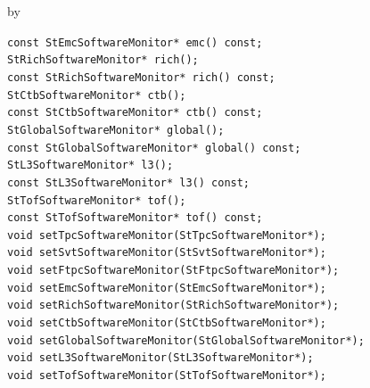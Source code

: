 \documentclass[twoside]{article}
\newcommand{\entrylabel}[1]{\mbox{\textbf{{#1}}}\hfil}%
\newenvironment{entry}
{\begin{list}{}%
    {\renewcommand{\makelabel}{\entrylabel}%
     \setlength{\labelwidth}{90pt}%
     \setlength{\leftmargin}{\labelwidth}
     \advance\leftmargin by \labelsep%
      }%
    }%
  {\end{list}}
\newcommand{\Entrylabel}[1]%
{\raisebox{0pt}[1ex][0pt]{\makebox[\labelwidth][l]%
    {\parbox[t]{\labelwidth}{\hspace{0pt}\textbf{{#1}}}}}}
\newenvironment{Entry}%
{\renewcommand{\entrylabel}{\Entrylabel}\begin{entry}}%
  {\end{entry}}
\begin{document}
\begin{Entry}
    \verb+const StEmcSoftwareMonitor* emc() const;+\\
    \verb+StRichSoftwareMonitor* rich();+\\
    \verb+const StRichSoftwareMonitor* rich() const;+\\
    \verb+StCtbSoftwareMonitor* ctb();+\\
    \verb+const StCtbSoftwareMonitor* ctb() const;+\\
    \verb+StGlobalSoftwareMonitor* global();+\\
    \verb+const StGlobalSoftwareMonitor* global() const;+\\
    \verb+StL3SoftwareMonitor* l3();+\\
    \verb+const StL3SoftwareMonitor* l3() const;+\\
    \verb+StTofSoftwareMonitor* tof();+\\
    \verb+const StTofSoftwareMonitor* tof() const;+\\

    \verb+void setTpcSoftwareMonitor(StTpcSoftwareMonitor*);+\\
    \verb+void setSvtSoftwareMonitor(StSvtSoftwareMonitor*);+\\
    \verb+void setFtpcSoftwareMonitor(StFtpcSoftwareMonitor*);+\\
    \verb+void setEmcSoftwareMonitor(StEmcSoftwareMonitor*);+\\
    \verb+void setRichSoftwareMonitor(StRichSoftwareMonitor*);+\\
    \verb+void setCtbSoftwareMonitor(StCtbSoftwareMonitor*);+\\
    \verb+void setGlobalSoftwareMonitor(StGlobalSoftwareMonitor*);+\\
    \verb+void setL3SoftwareMonitor(StL3SoftwareMonitor*);+\\
    \verb+void setTofSoftwareMonitor(StTofSoftwareMonitor*);+\\
\end{Entry}
\clearpage
\end{document}

